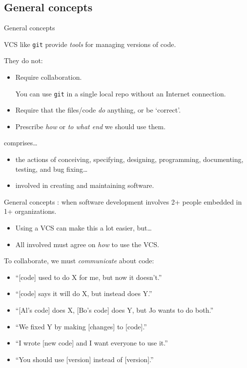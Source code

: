 \documentclass[12pt,aspectratio=169]{beamer}
\begin{document}
\subsection{General concepts}
\begin{frame}{General concepts}

  VCS like \texttt{git} provide \emph{tools} for managing versions of code.

  \bigskip
  They do not:
  \begin{itemize}
    \item Require collaboration.

          You can use \texttt{git} in a single local repo without an Internet connection.
    \item Require that the files/code \emph{do} anything, or be ‘correct’.
    \item Prescribe \emph{how} or \emph{to what end} we should use them.
  \end{itemize}

  \bigskip
   comprises…
  \begin{itemize}
    \item the actions of conceiving, specifying, designing, programming, documenting, testing, and bug fixing…
    \item involved in creating and maintaining software.
  \end{itemize}
\end{frame}

\begin{frame}{General concepts}
  : when software development involves 2+ people embedded in 1+ organizations.

  \begin{itemize}
    \item Using a VCS can make this a lot easier, but…
    \item All involved must agree on \emph{how} to use the VCS.
  \end{itemize}

  \bigskip
  To collaborate, we must \emph{communicate} about code:
  \begin{itemize}
    \item “[code] used to do X for me, but now it doesn't.”
    \item “[code] says it will do X, but instead does Y.”
    \item “[Al's code] does X, [Bo's code] does Y, but Jo wants to do both.”
    \item “We fixed Y by making [changes] to [code].”
    \item “I wrote [new code] and I want everyone to use it.”
    \item “You should use [version] instead of [version].”
  \end{itemize}

\end{frame}
\end{document}
